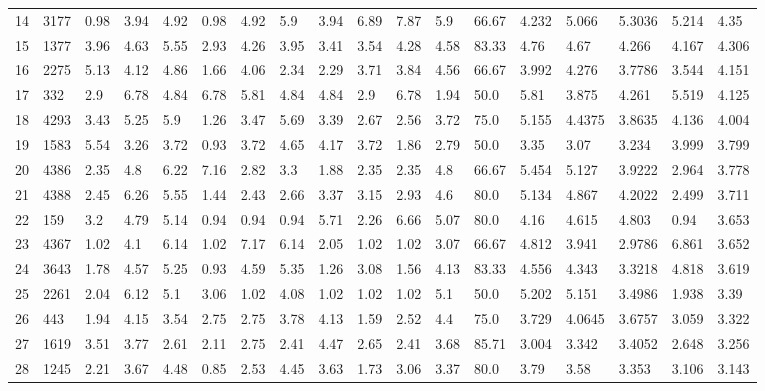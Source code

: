 \documentclass[landscape, 10pt]{report}
\begin{document}
\begin{longtable}{l || l || l | l | l | l | l | l | l | l | l | l | l || l | l | l | l | l}
14 & 3177 & 0.98 & 3.94 & 4.92 & 0.98 & 4.92 & 5.9 & 3.94 & 6.89 & 7.87 & 5.9 & 66.67 & 4.232 & 5.066 & 5.3036 & 5.214 & 4.35\\ 
\rowcolor{lightgray}15 & 1377 & 3.96 & 4.63 & 5.55 & 2.93 & 4.26 & 3.95 & 3.41 & 3.54 & 4.28 & 4.58 & 83.33 & 4.76 & 4.67 & 4.266 & 4.167 & 4.306\\ 
16 & 2275 & 5.13 & 4.12 & 4.86 & 1.66 & 4.06 & 2.34 & 2.29 & 3.71 & 3.84 & 4.56 & 66.67 & 3.992 & 4.276 & 3.7786 & 3.544 & 4.151\\ 
\rowcolor{lightgray}17 & 332 & 2.9 & 6.78 & 4.84 & 6.78 & 5.81 & 4.84 & 4.84 & 2.9 & 6.78 & 1.94 & 50.0 & 5.81 & 3.875 & 4.261 & 5.519 & 4.125\\ 
18 & 4293 & 3.43 & 5.25 & 5.9 & 1.26 & 3.47 & 5.69 & 3.39 & 2.67 & 2.56 & 3.72 & 75.0 & 5.155 & 4.4375 & 3.8635 & 4.136 & 4.004\\ 
\rowcolor{lightgray}19 & 1583 & 5.54 & 3.26 & 3.72 & 0.93 & 3.72 & 4.65 & 4.17 & 3.72 & 1.86 & 2.79 & 50.0 & 3.35 & 3.07 & 3.234 & 3.999 & 3.799\\ 
20 & 4386 & 2.35 & 4.8 & 6.22 & 7.16 & 2.82 & 3.3 & 1.88 & 2.35 & 2.35 & 4.8 & 66.67 & 5.454 & 5.127 & 3.9222 & 2.964 & 3.778\\ 
\rowcolor{lightgray}21 & 4388 & 2.45 & 6.26 & 5.55 & 1.44 & 2.43 & 2.66 & 3.37 & 3.15 & 2.93 & 4.6 & 80.0 & 5.134 & 4.867 & 4.2022 & 2.499 & 3.711\\ 
22 & 159 & 3.2 & 4.79 & 5.14 & 0.94 & 0.94 & 0.94 & 5.71 & 2.26 & 6.66 & 5.07 & 80.0 & 4.16 & 4.615 & 4.803 & 0.94 & 3.653\\ 
\rowcolor{lightgray}23 & 4367 & 1.02 & 4.1 & 6.14 & 1.02 & 7.17 & 6.14 & 2.05 & 1.02 & 1.02 & 3.07 & 66.67 & 4.812 & 3.941 & 2.9786 & 6.861 & 3.652\\ 
24 & 3643 & 1.78 & 4.57 & 5.25 & 0.93 & 4.59 & 5.35 & 1.26 & 3.08 & 1.56 & 4.13 & 83.33 & 4.556 & 4.343 & 3.3218 & 4.818 & 3.619\\ 
\rowcolor{lightgray}25 & 2261 & 2.04 & 6.12 & 5.1 & 3.06 & 1.02 & 4.08 & 1.02 & 1.02 & 1.02 & 5.1 & 50.0 & 5.202 & 5.151 & 3.4986 & 1.938 & 3.39\\ 
26 & 443 & 1.94 & 4.15 & 3.54 & 2.75 & 2.75 & 3.78 & 4.13 & 1.59 & 2.52 & 4.4 & 75.0 & 3.729 & 4.0645 & 3.6757 & 3.059 & 3.322\\ 
\rowcolor{lightgray}27 & 1619 & 3.51 & 3.77 & 2.61 & 2.11 & 2.75 & 2.41 & 4.47 & 2.65 & 2.41 & 3.68 & 85.71 & 3.004 & 3.342 & 3.4052 & 2.648 & 3.256\\ 
28 & 1245 & 2.21 & 3.67 & 4.48 & 0.85 & 2.53 & 4.45 & 3.63 & 1.73 & 3.06 & 3.37 & 80.0 & 3.79 & 3.58 & 3.353 & 3.106 & 3.143\\ 

\end{longtable}
\end{document}
